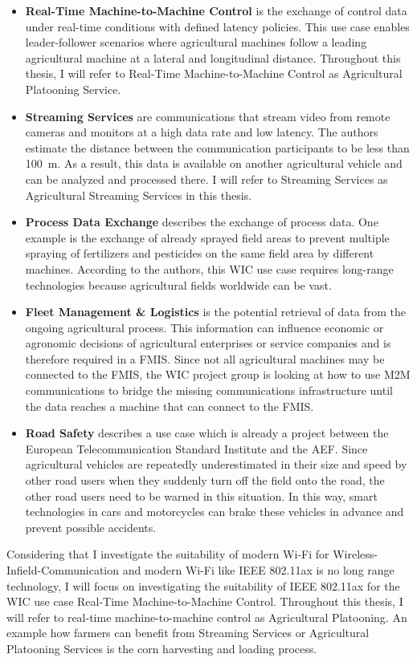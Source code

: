 \begin{itemize}
	\item \textbf{Real-Time Machine-to-Machine Control} is the exchange of control data under real-time conditions with defined latency policies. This use case enables leader-follower scenarios where agricultural machines follow a leading agricultural machine at a lateral and longitudinal distance. Throughout this thesis, I will refer to Real-Time Machine-to-Machine Control as Agricultural Platooning Service.
	\item \textbf{Streaming Services} are communications that stream video from remote cameras and monitors at a high data rate and low latency. The authors estimate the distance between the communication participants to be less than \SI{100}{\metre}. As a result, this data is available on another agricultural vehicle and can be analyzed and processed there.
	I will refer to Streaming Services as Agricultural Streaming Services in this thesis. %
	\item \textbf{Process Data Exchange} describes the exchange of process data. One example is the exchange of already sprayed field areas to prevent multiple spraying of fertilizers and pesticides on the same field area by different machines. According to the authors, this \ac{WIC} use case requires long-range technologies because agricultural fields worldwide can be vast.
	\item \textbf{Fleet Management \& Logistics} is the potential retrieval of data from the ongoing agricultural process. This information can influence economic or agronomic decisions of agricultural enterprises or service companies and is therefore required in a \ac{FMIS}.
	Since not all agricultural machines may be connected to the \ac{FMIS}, the \ac{WIC} project group is looking at how to use \ac{M2M} communications to bridge the missing communications infrastructure until the data reaches a machine that can connect to the \ac{FMIS}.
	\item \textbf{Road Safety} describes a use case which is already a project between the European Telecommunication Standard Institute and the \ac{AEF}. Since agricultural vehicles are repeatedly underestimated in their size and speed by other road users when they suddenly turn off the field onto the road, the other road users need to be warned in this situation. In this way, smart technologies in cars and motorcycles can brake these vehicles in advance and prevent possible accidents.
\end{itemize}

Considering that I investigate the suitability of modern Wi-Fi for Wireless-Infield-Communication and modern Wi-Fi like IEEE 802.11ax is no long range technology,
I will focus on investigating the suitability of IEEE 802.11ax for the \ac{WIC} use case Real-Time Machine-to-Machine Control.
Throughout this thesis, I will refer to real-time machine-to-machine control as Agricultural Platooning.
An example how farmers can benefit from Streaming Services or Agricultural Platooning Services is the corn harvesting and loading process.
